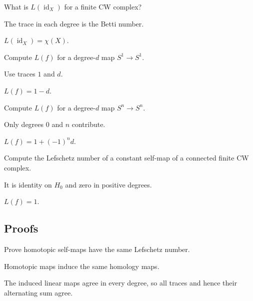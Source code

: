 \begin{exercise}\label{exr:viii35-ped-02}
What is $L(\operatorname{id}_X)$ for a finite CW complex?
\end{exercise}
\begin{hint}
The trace in each degree is the Betti number.
\end{hint}
\begin{solution}
$L(\operatorname{id}_X)=\chi(X)$.
\end{solution}

\begin{exercise}\label{exr:viii35-ped-03}
Compute $L(f)$ for a degree-$d$ map $S^1\to S^1$.
\end{exercise}
\begin{hint}
Use traces $1$ and $d$.
\end{hint}
\begin{solution}
$L(f)=1-d$.
\end{solution}

\begin{exercise}\label{exr:viii35-ped-04}
Compute $L(f)$ for a degree-$d$ map $S^n\to S^n$.
\end{exercise}
\begin{hint}
Only degrees $0$ and $n$ contribute.
\end{hint}
\begin{solution}
$L(f)=1+(-1)^n d$.
\end{solution}

\begin{exercise}\label{exr:viii35-ped-05}
Compute the Lefschetz number of a constant self-map of a connected finite CW complex.
\end{exercise}
\begin{hint}
It is identity on $H_0$ and zero in positive degrees.
\end{hint}
\begin{solution}
$L(f)=1$.
\end{solution}

\subsection*{Proofs}

\begin{exercise}\label{exr:viii35-ped-06}
Prove homotopic self-maps have the same Lefschetz number.
\end{exercise}
\begin{hint}
Homotopic maps induce the same homology maps.
\end{hint}
\begin{solution}
The induced linear maps agree in every degree, so all traces and hence their alternating sum agree.
\end{solution}

